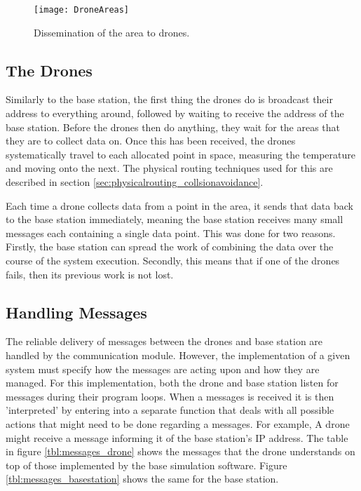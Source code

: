 \begin{figure}[h!]
\centering
\texttt{[image: DroneAreas]}
\caption{Dissemination of the area to drones.}
\label{fig:area_dissemination}
\end{figure}

\subsection{The Drones}
Similarly to the base station, the first thing the drones do is broadcast their address to everything around, followed by waiting to receive the address of the base station. Before the drones then do anything, they wait for the areas that they are to collect data on. Once this has been received, the drones systematically travel to each allocated point in space, measuring the temperature and moving onto the next. The physical routing techniques used for this are described in section \ref{sec:physicalrouting_collsionavoidance}.

Each time a drone collects data from a point in the area, it sends that data back to the base station immediately, meaning the base station receives many small messages each containing a single data point. This was done for two reasons. Firstly, the base station can spread the work of combining the data over the course of the system execution. Secondly, this means that if one of the drones fails, then its previous work is not lost.

\subsection{Handling Messages}

The reliable delivery of messages between the drones and base station are handled by the communication module. However, the implementation of a given system must specify how the messages are acting upon and how they are managed. For this implementation, both the drone and base station listen for messages during their program loops. When a messages is received it is then 'interpreted' by entering into a separate function that deals with all possible actions that might need to be done regarding a messages. For example, A drone might receive a message informing it of the base station's IP address. The table in figure \ref{tbl:messages_drone} shows the messages that the drone understands on top of those implemented by the base simulation software. Figure \ref{tbl:messages_basestation} shows the same for the base station.

